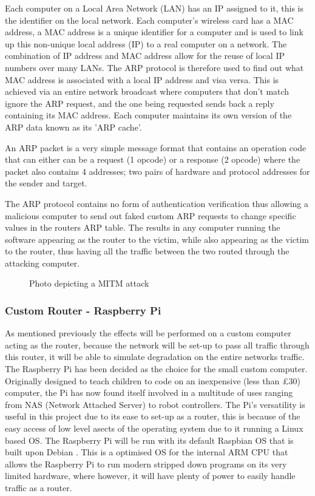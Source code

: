 Each computer on a Local Area Network (LAN) has an IP assigned to it, this is the identifier on the local network. Each computer's wireless card has a MAC address, a MAC address is a unique identifier for a computer and is used to link up this non-unique local address (IP) to a real computer on a network. The combination of IP address and MAC address allow for the reuse of local IP numbers over many LANs. The ARP protocol is therefore used to find out what MAC address is associated with a local IP address and visa versa. This is achieved via an entire network broadcast where computers that don't match ignore the ARP request, and the one being requested sends back a reply containing its MAC address. Each computer maintains its own version of the ARP data known as its 'ARP cache'.

An ARP packet is a very simple message format that contains an operation code that can either can be a request (1 opcode) or a response (2 opcode) where the packet also contains 4 addresses; two pairs of hardware and protocol addresses for the sender and target.

The ARP protocol contains no form of authentication verification thus allowing a malicious computer to send out faked custom ARP requests to change specific values in the routers ARP table. The results in any computer running the software appearing as the router to the victim, while also appearing as the victim to the router, thus having all the traffic between the two routed through the attacking computer. 

\begin{center}

	\begin{figure}[h]
		\caption{Photo depicting a MITM attack}
	\end{figure}
\end{center}

\subsubsection{Custom Router - Raspberry Pi}
As mentioned previously the effects will be performed on a custom computer acting as the router, because the network will be set-up to pass all traffic through this router, it will be able to simulate degradation on the entire networks traffic.
The Raspberry Pi \citep{upton2014raspberry} has been decided as the choice for the small custom computer. Originally designed to teach children to code on an inexpensive (less than £30) computer, the Pi has now found itself involved in a multitude of uses ranging from NAS (Network Attached Server) to robot controllers. The Pi's versatility is useful in this project due to its ease to set-up as a router, this is because of the easy access of low level asects of the operating system due to it running a Linux based OS. The Raspberry Pi will be run with its default Raspbian OS \citep{pi2014raspbian} that is built upon Debian \citep{murdock1994overview}. This is a optimised OS for the internal ARM CPU that allows the Raspberry Pi to run modern stripped down programs on its very limited hardware, where however, it will have plenty of power to easily handle traffic as a router.




